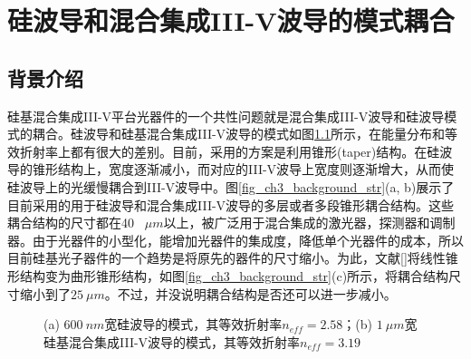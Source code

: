 \chapter{硅波导和混合集成III-V波导的模式耦合}
\section{背景介绍}
硅基混合集成III-V平台光器件的一个共性问题就是混合集成III-V波导和硅波导模式的耦合。硅波导和硅基混合集成III-V波导的模式如图\ref{fig_ch3_si_hybrid_mode}所示，在能量分布和等效折射率上都有很大的差别。目前，采用的方案是利用锥形(taper)结构。在硅波导的锥形结构上，宽度逐渐减小，而对应的III-V波导上宽度则逐渐增大，从而使硅波导上的光缓慢耦合到III-V波导中。图\ref{fig_ch3_background_str}(a, b)展示了目前采用的用于硅波导和混合集成III-V波导的多层或者多段锥形耦合结构\cite{kurczveil2013characterization, keyvaninia2009engineering}。这些耦合结构的尺寸都在40 ~$\mu m$以上，被广泛用于混合集成的激光器，探测器和调制器。由于光器件的小型化，能增加光器件的集成度，降低单个光器件的成本，所以目前硅基光子器件的一个趋势是将原先的器件的尺寸缩小。为此，文献[]将线性锥形结构变为曲形锥形结构，如图\ref{fig_ch3_background_str}(c)所示，将耦合结构尺寸缩小到了$25~\mu m$。不过，并没说明耦合结构是否还可以进一步减小。
\begin{figure}[htb]
	\small
	\caption{(a) $600~nm$宽硅波导的模式，其等效折射率$n_{eff}=2.58$；(b) $1~\mu m$宽硅基混合集成III-V波导的模式，其等效折射率$n_{eff}=3.19$}
	\label{fig_ch3_si_hybrid_mode}	
\end{figure}
		
